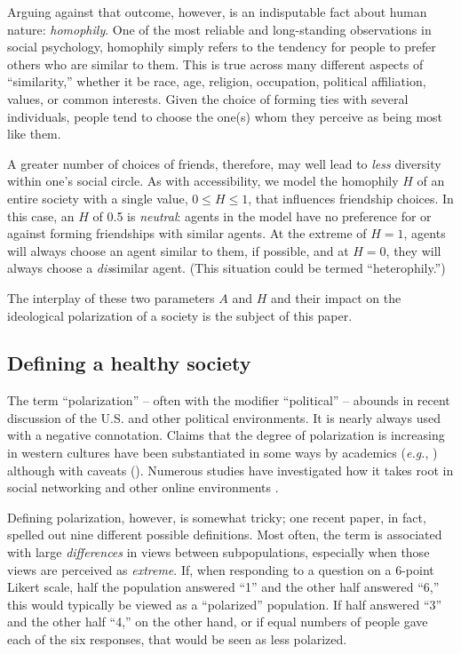 Arguing against that outcome, however, is an indisputable fact about human
nature: \textit{homophily}. One of the most reliable and long-standing
observations in social psychology, homophily simply refers to the tendency for
people to prefer others who are similar to them.\cite{mcpherson_birds_2001}
This is true across many different aspects of ``similarity,'' whether it be
race, age, religion, occupation, political affiliation, values, or common
interests. Given the choice of forming ties with several individuals, people
tend to choose the one(s) whom they perceive as being most like them. 

A greater number of choices of friends, therefore, may well lead to
\textit{less} diversity within one's social circle. As with accessibility, we
model the homophily $H$ of an entire society with a single value, $0 \leq H
\leq 1$, that influences friendship choices. In this case, an $H$ of 0.5 is
\textit{neutral}: agents in the model have no preference for or against
forming friendships with similar agents. At the extreme of $H=1$, agents will
always choose an agent similar to them, if possible, and at $H=0$, they will
always choose a \textit{dis}similar agent. (This situation could be termed
``heterophily.'')

The interplay of these two parameters $A$ and $H$ and their impact on the
ideological polarization of a society is the subject of this paper.

\subsection{Defining a healthy society}

The term ``polarization'' -- often with the modifier ``political'' -- abounds in
recent discussion of the U.S. and other political
env\-ironments\cite{campbell_source_2016,french_were_2017,dimock_political_2014,mccarty_polarized_2016}.
It is nearly always used with a negative connotation. Claims that the degree
of polarization is increasing in western cultures have been substantiated in
some ways by academics (\textit{e.g.},
\cite{baldassarri_partisans_2008,prior_media_2013,abramowitz_new_2015})
although with caveats
(\cite{baldassarri_dynamics_2007,fiorina_political_2008,abrams_party_2015}).
Numerous studies have investigated how it takes root in social networking and
other online environments
\cite{mousavi_role_2014,conover_political_2011,adamic_political_2005,hargittai_cross-ideological_2008}.

Defining polarization, however, is somewhat tricky; one recent paper, in fact,
spelled out nine different possible
definitions\cite{bramson_disambiguation_2016}. Most often, the term is
associated with large \textit{differences} in views between subpopulations,
especially when those views are perceived as \textit{extreme}. If, when
responding to a question on a 6-point Likert scale, half the population
answered ``1'' and the other half answered ``6,'' this would typically be viewed
as a ``polarized'' population. If half answered ``3'' and the other half
``4,''
on the other hand, or if equal numbers of people gave each of the six
responses, that would be seen as less polarized.

